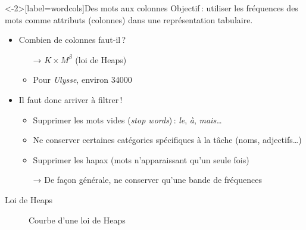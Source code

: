 \documentclass[../allslides.tex]{subfiles}
\begin{document}
\begin{frame}<-2>[label=wordcols]{Des mots aux colonnes}
	Objectif : utiliser les \alert{fréquences} des mots comme attributs (colonnes) dans une représentation tabulaire.
	\pause
	\begin{itemize}
		\item<+-> Combien de colonnes faut-il ?
			\pause
			\begin{itemize}
				\item[→] $K×M^β$ (loi de Heaps)
				\item Pour \emph{Ulysse}, environ \num{34000}
			\end{itemize}
		\item<+-> Il faut donc arriver à filtrer !
			\begin{itemize}[<+->]
				\item Supprimer les \alert{mots vides} (\emph{stop words}) : \emph{le}, \emph{à}, \emph{mais}…
				\item Ne conserver certaines catégories spécifiques à la tâche (noms, adjectifs…)
				\item Supprimer les \alert{hapax} (mots n'apparaissant qu'un seule fois)
				\item[→] De façon générale, ne conserver qu'une \alert{bande de fréquences}
			\end{itemize}
	\end{itemize}
\end{frame}

\begin{frame}{Loi de Heaps}
	\begin{figure}
		\tikzset{external/export=true}
		\caption{Courbe d'une loi de Heaps}
	\end{figure}
\end{frame}

\end{document}
